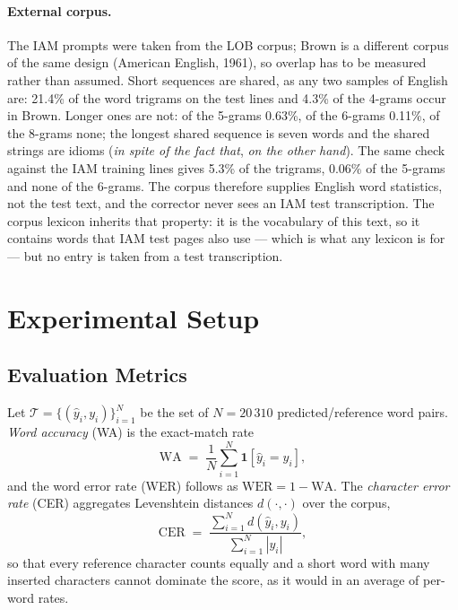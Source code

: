 \documentclass{ws-ijprai}
\newcommand{\nsamples}{20\,310}
\begin{document}
\paragraph{External corpus.}
The IAM prompts were taken from the LOB corpus; Brown is a different
corpus of the same design (American English, 1961), so overlap has to
be measured rather than assumed. Short sequences are shared, as any two
samples of English are: 21.4\% of the word trigrams on the test lines and
4.3\% of the 4-grams occur in Brown. Longer ones are not: of the 5-grams
0.63\%, of the 6-grams 0.11\%, of the 8-grams none; the longest shared
sequence is seven words and the shared strings are idioms (\emph{in spite
of the fact that}, \emph{on the other hand}). The same check against the
IAM training lines gives 5.3\% of the trigrams, 0.06\% of the 5-grams and
none of the 6-grams. The corpus therefore supplies English word statistics, not the
test text, and the corrector never sees an IAM test transcription. The
corpus lexicon inherits that property: it is the vocabulary of this text, so
it contains words that IAM test pages also use --- which is what any lexicon
is for --- but no entry is taken from a test transcription.

\section{Experimental Setup}
\label{sec:experiments}

\subsection{Evaluation Metrics}
Let $\mathcal{T}=\{(\hat{y}_i, y_i)\}_{i=1}^{N}$ be the set of
$N=\nsamples$ predicted/reference word pairs. \emph{Word accuracy}
(WA) is the exact-match rate
\begin{equation}
\mathrm{WA} \;=\; \frac{1}{N}\sum_{i=1}^{N}
      \mathbf{1}\!\left[\hat{y}_i = y_i\right],
\label{eq:wa}
\end{equation}
and the word error rate (WER) follows as
$\mathrm{WER}=1-\mathrm{WA}$. The \emph{character error rate} (CER)
aggregates Levenshtein distances $d(\cdot,\cdot)$ over the corpus,
\begin{equation}
\mathrm{CER} \;=\;
  \frac{\sum_{i=1}^{N} d(\hat{y}_i, y_i)}
       {\sum_{i=1}^{N} |y_i|},
\label{eq:cer}
\end{equation}
so that every reference character counts equally and a short word with
many inserted characters cannot dominate the score, as it would in an
average of per-word rates.
\end{document}
